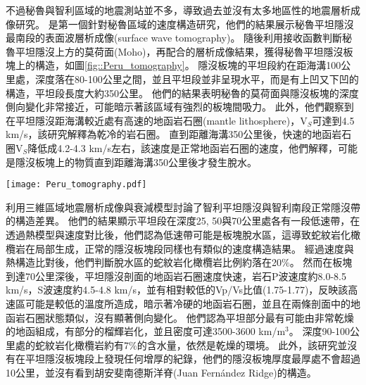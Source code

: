 不過秘魯與智利區域的地震測站並不多，導致過去並沒有太多地區性的地震層析成像研究。
\citealp{Ma2014}是第一個針對秘魯區域的速度構造研究，他們的結果展示秘魯平坦隱沒最南段的表面波層析成像(surface wave tomography)。
隨後\citealp{Ma2015}利用接收函數判斷秘魯平坦隱沒上方的莫荷面(Moho)，再配合\citealp{Ma2014}的層析成像結果，獲得秘魯平坦隱沒板塊上的構造，如圖\ref{fig::Peru_tomography}。
隱沒板塊的平坦段約在距海溝100公里處，深度落在80-100公里之間，並且平坦段並非呈現水平，而是有上凹又下凹的構造，平坦段長度大約350公里。
他們的結果表明秘魯的莫荷面與隱沒板塊的深度側向變化非常接近，可能暗示著該區域有強烈的板塊間吸力。
此外，他們觀察到在平坦隱沒距海溝較近處有高速的地函岩石圈(mantle lithosphere)，V$_S$可達到4.5 km/s，該研究解釋為乾冷的岩石圈。
直到距離海溝350公里後，快速的地函岩石圈V$_S$降低成4.2-4.3 km/s左右，該速度是正常地函岩石圈的速度，他們解釋，可能是隱沒板塊上的物質直到距離海溝350公里後才發生脫水。

\begin{figure*}[ht!]
    \centering
    \texttt{[image: Peru\_tomography.pdf]}
    \caption[秘魯平坦隱沒南段地震學研究結果與解釋圖，摘自\citealp{Ma2015}。]{秘魯平坦隱沒南段地震學研究結果與解釋圖，摘自\citealp{Ma2015}。(a)深度80公里的V$_SV$速度構造，來自\citealp{Ma2014}。圖中左上方標示高速地函岩石圈與正常地函岩石圈的分界。紅色虛線標示出於20公里深的地素帶範圍，該低速帶被解釋為熔融區。粉紅色線為板塊等深度線。紅色實線為圖(C)剖面位置。灰色點為該研究所使用的側站位置。(b)板塊等深度圖，各顏色點為接收函數轉換波的地殼入射點，顏色代表不同深度。灰色點為該研究所使用的側站位置。(c)AA'剖面剪力波(shear wave)速度構造圖，白色點與紅色點分別為接收函數於西北地震事件群雨東南地震事件群所獲得之板塊深度。
    }
    \label{fig::Peru_tomography}
\end{figure*}

\citealp{Marot2014}利用三維區域地震層析成像與衰減模型討論了智利平坦隱沒與智利南段正常隱沒帶的構造差異。
他們的結果顯示平坦段在深度25, 50與70公里處各有一段低速帶，在透過熱模型與速度對比後，他們認為低速帶可能是板塊脫水區，這導致蛇紋岩化橄欖岩在局部生成，正常的隱沒板塊段同樣也有類似的速度構造結果。
經過速度與熱構造比對後，他們判斷脫水區的蛇紋岩化橄欖岩比例約落在20$\%$。
然而在板塊到達70公里深後，平坦隱沒剖面的地函岩石圈速度快速，岩石P波速度約8.0-8.5 km/s，S波速度約4.5-4.8 km/s，並有相對較低的Vp/Vs比值(1.75-1.77)，反映該高速區可能是較低的溫度所造成，暗示著冷硬的地函岩石圈，並且在兩條剖面中的地函岩石圈狀態類似，沒有顯著側向變化。
他們認為平坦部分最有可能由非常乾燥的地函組成，有部分的榴輝岩化，並且密度可達3500-3600 km/m$^3$。
深度90-100公里處的蛇紋岩化橄欖岩約有7$\%$的含水量，依然是乾燥的環境。
此外，該研究並沒有在平坦隱沒板塊段上發現任何增厚的紀錄，他們的隱沒板塊厚度最厚處不會超過10公里，並沒有看到胡安斐南德斯洋脊(Juan Fernández Ridge)的構造。

